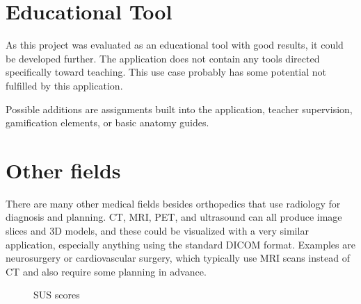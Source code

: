 \documentclass[a4paper]{report}
\begin{document}
\section{Educational Tool}
As this project was evaluated as an educational tool with good results, it could be developed further. The application does not contain any tools directed specifically toward teaching. This use case probably has some potential not fulfilled by this application.

Possible additions are assignments built into the application, teacher supervision, gamification elements, or basic anatomy guides.

\section{Other fields}
There are many other medical fields besides orthopedics that use radiology for diagnosis and planning.
CT, MRI, PET, and ultrasound can all produce image slices and 3D models, and these could be visualized with a very similar application, especially anything using the standard DICOM format.
Examples are neurosurgery or cardiovascular surgery, which typically use MRI scans instead of CT and also require some planning in advance.


\appendix


\begin{figure}[h!]
    \centering
	\hfill
	\caption{SUS scores}\label{sus}
  \small
\end{figure}
\end{document}
